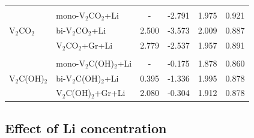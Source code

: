 \begin{table}[htbp]
{\begin{tabularx}{\textwidth}{llcccc}
              & & & & \\
\multirow{3}{*}{V$_2$CO$_2$}     &mono-V$_2$CO$_2$+Li                                              & -                        & -2.791                         & 1.975                     & 0.921                        \\
              &bi-V$_2$CO$_2$+Li                                                 & 2.500               & -3.573                         & 2.009                     & 0.887                        \\
              &V$_2$CO$_2$+Gr+Li                                                  & 2.779                  & -2.537                         & 1.957                     & 0.891                        \\ 
              & & & & \\
\multirow{3}{*}{V$_2$C(OH)$_2$}  &mono-V$_2$C(OH)$_2$+Li                                            & -                        & -0.175                         & 1.878                     & 0.860                       \\
              &bi-V$_2$C(OH)$_2$+Li                                                 & 0.395                   & -1.336                         & 1.995                     & 0.878                        \\
              &V$_2$C(OH)$_2$+Gr+Li                                                 & 2.080                  & -0.304                         & 1.912                     & 0.878  \\ \hline                     
\end{tabularx}
}
\end{table}


\subsection{Effect of Li concentration}

